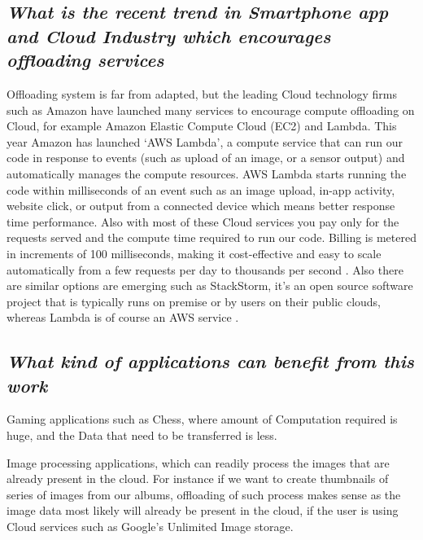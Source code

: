 \documentclass[12pt]{report}
\begin{document}
\subsection{\textit{What is the recent trend in Smartphone app and Cloud Industry which encourages offloading services}}
Offloading system is far from adapted, but the leading Cloud technology firms such as Amazon have launched many services to encourage compute offloading on Cloud, for example Amazon Elastic Compute Cloud (EC2) and Lambda. This year Amazon has launched `AWS Lambda', a compute service that can run our code in response to events (such as upload of an image, or a sensor output) and automatically manages the compute resources. AWS Lambda starts running the code within milliseconds of an event such as an image upload, in-app activity, website click, or output from a connected device which means better response time performance. Also with most of these Cloud services you pay only for the requests served and the compute time required to run our code. Billing is metered in increments of 100 milliseconds, making it cost-effective and easy to scale automatically from a few requests per day to thousands per second \cite{AmazonLambda}.
Also there are similar options are emerging such as StackStorm, it's an open source software project that is typically runs on premise or by users on their public clouds, whereas Lambda is of course an AWS service \cite{StackStorm}.
\subsection{\textit{What kind of applications can benefit from this work}}

Gaming applications such as Chess, where amount of Computation required is huge, and the Data that need to be transferred is less.

Image processing applications, which can readily process the images that are already present in the cloud. For instance if we want to create thumbnails of series of images from our albums, offloading of such process makes sense as the image data most likely will already be present in the cloud, if the user is using Cloud services such as Google's Unlimited Image storage.
\end{document}
